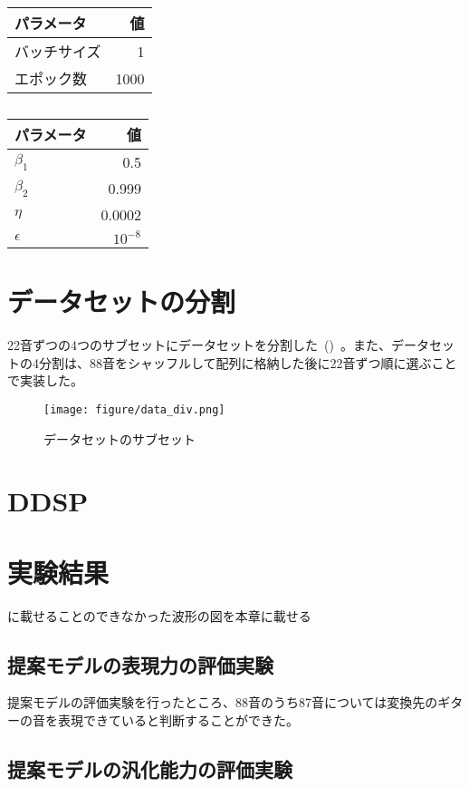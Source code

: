 \begin{table}[h]
\centering
\begin{minipage}{0.49\columnwidth}
    \centering
        \begin{tabular}{lr}\toprule
            パラメータ & 値 \\ \midrule
            バッチサイズ & 1 \\ 
            エポック数 & 1000 \\ \bottomrule
        \end{tabular}
    \caption{}
    \label{tab:params1}
\end{minipage}
\begin{minipage}{0.49\columnwidth}
    \centering
        \begin{tabular}{lr}\toprule
            パラメータ & 値 \\ \midrule
            $\beta_1$ & 0.5 \\
            $\beta_2$ & 0.999 \\
            $\eta$ & 0.0002 \\ 
            $\epsilon$ & $10^{-8}$ \\ \bottomrule
        \end{tabular}
    \caption{}
    \label{tab:params2}
\end{minipage}
\end{table}

\chapter{データセットの分割}
\label{app:split}

22音ずつの4つのサブセットにデータセットを分割した~()~。また、データセットの4分割は、88音をシャッフルして配列に格納した後に22音ずつ順に選ぶことで実装した。

\begin{figure}[h]
\centering
\texttt{[image: figure/data\_div.png]}
\caption{データセットのサブセット}
\label{fig:data_div}
\end{figure}

\chapter{DDSP}
\label{app:DDSP}

\chapter{実験結果}
\label{app:result}

に載せることのできなかった波形の図を本章に載せる

\section{提案モデルの表現力の評価実験}

提案モデルの評価実験を行ったところ、88音のうち87音については変換先のギターの音を表現できていると判断することができた。


\section{提案モデルの汎化能力の評価実験}